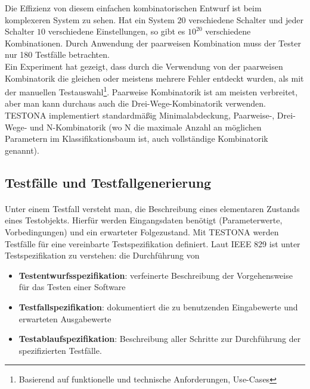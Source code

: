 Die Effizienz von diesem einfachen kombinatorischen Entwurf ist beim komplexeren System zu sehen. Hat ein System $20$ verschiedene Schalter und jeder Schalter $10$ verschiedene Einstellungen, so gibt es $10^{20}$ verschiedene Kombinationen. Durch Anwendung der paarweisen Kombination muss der Tester nur 180 Testfälle betrachten.\\

Ein Experiment hat gezeigt, dass durch die Verwendung von der paarweisen Kombinatorik die gleichen oder meistens mehrere Fehler entdeckt wurden, als mit der manuellen Testauswahl\footnote{Basierend auf funktionelle und technische Anforderungen, Use-Cases}. Paarweise Kombinatorik ist am meisten verbreitet, aber man kann durchaus auch die Drei-Wege-Kombinatorik verwenden. TESTONA implementiert standardmäßig Minimalabdeckung, Paarweise-, Drei-Wege- und N-Kombinatorik (wo N die maximale Anzahl an möglichen Parametern im Klassifikationsbaum ist, auch vollständige Kombinatorik genannt)\cite{CombinatorialSoftTesting}.\\




\subsection{Testfälle und Testfallgenerierung}
\paragraph{}

Unter einem Testfall versteht man, die Beschreibung eines elementaren Zustands eines Testobjekts. Hierfür werden Eingangsdaten benötigt (Parameterwerte, Vorbedingungen) und ein erwarteter Folgezustand. Mit TESTONA werden Testfälle für eine vereinbarte Testspezifikation definiert. Laut IEEE 829 ist unter Testspezifikation zu verstehen: die Durchführung von

\begin{itemize}
\item\textbf{ Testentwurfsspezifikation}: verfeinerte Beschreibung der Vorgehensweise für das Testen einer Software
\item \textbf{Testfallspezifikation}: dokumentiert die zu benutzenden Eingabewerte und erwarteten Ausgabewerte
\item \textbf{Testablaufspezifikation}: Beschreibung aller Schritte zur Durchführung der spezifizierten Testfälle.
\end{itemize}

